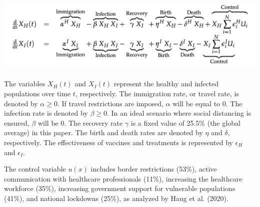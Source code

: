 \vspace{5mm}
\includegraphics[width=14.5cm, height=3.7cm]{img/(2).png}
\vspace{5mm}

The variables $X_H(t)$ and $X_I(t)$ represent the healthy and infected populations over time $t$, respectively. The immigration rate, or travel rate, is denoted by $\alpha \geq 0$. If travel restrictions are imposed, $\alpha$ will be equal to 0. The infection rate is denoted by $\beta \geq 0$. In an ideal scenario where social distancing is ensured, $\beta$ will be 0. The recovery rate $\gamma$ is a fixed value of 25.5\% (the global average) in this paper. The birth and death rates are denoted by $\eta$ and $\delta$, respectively. The effectiveness of vaccines and treatments is represented by $\epsilon_H$ and $\epsilon_I$.

The control variable $u(x)$ includes border restrictions (53\%), active communication with healthcare professionals (11\%), increasing the healthcare workforce (35\%), increasing government support for vulnerable populations (41\%), and national lockdowns (25\%), as analyzed by Haug et al. (2020). 
